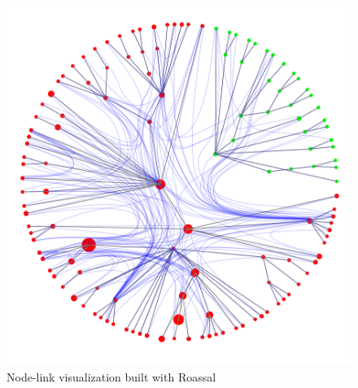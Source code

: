 \documentclass [11pt, a4wide, twoside]{article}
\begin{document}
\begin{figure}[H]
\centering
\includegraphics[scale=0.5]{images/3.png}
\caption{Node-link visualization built with Roassal}
\label{fig:node-link}
\end{figure}

\end{document}
